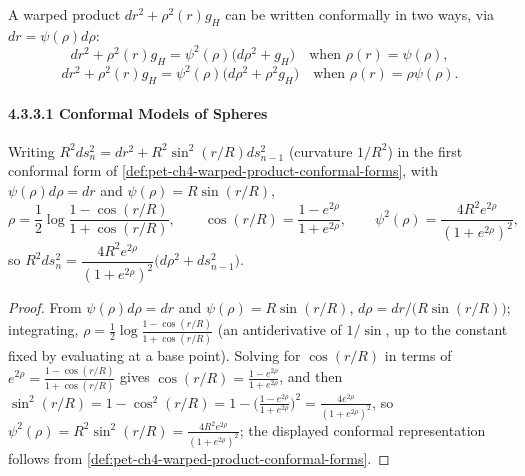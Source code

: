 \begin{definition}
  \label{def:pet-ch4-warped-product-conformal-forms}
  A warped product $dr^2+\rho^2(r)g_H$ can be written conformally in two ways,
  via $dr=\psi(\rho)d\rho$:
  \[
    dr^2+\rho^2(r)g_H=\psi^2(\rho)\big(d\rho^2+g_H\big)\quad\text{when }\rho(r)=\psi(\rho),
  \]
  \[
    dr^2+\rho^2(r)g_H=\psi^2(\rho)\big(d\rho^2+\rho^2g_H\big)\quad\text{when }\rho(r)=\rho\psi(\rho).
  \]
\end{definition}

\paragraph{4.3.3.1 Conformal Models of Spheres}

\begin{proposition}
  \label{prop:pet-ch4-mercator-model}
  Writing $R^2ds_n^2=dr^2+R^2\sin^2(r/R)ds_{n-1}^2$ (curvature $1/R^2$) in the
  first conformal form of \cref{def:pet-ch4-warped-product-conformal-forms},
  with $\psi(\rho)d\rho=dr$ and $\psi(\rho)=R\sin(r/R)$,
  \[
    \rho=\frac12\log\frac{1-\cos(r/R)}{1+\cos(r/R)},\qquad
    \cos(r/R)=\frac{1-e^{2\rho}}{1+e^{2\rho}},\qquad
    \psi^2(\rho)=\frac{4R^2e^{2\rho}}{(1+e^{2\rho})^2},
  \]
  so $R^2ds_n^2=\dfrac{4R^2e^{2\rho}}{(1+e^{2\rho})^2}\big(d\rho^2+ds_{n-1}^2\big)$.
\end{proposition}
\begin{proof}
  From $\psi(\rho)d\rho=dr$ and $\psi(\rho)=R\sin(r/R)$,
  $d\rho=dr/\big(R\sin(r/R)\big)$; integrating,
  $\rho=\tfrac12\log\tfrac{1-\cos(r/R)}{1+\cos(r/R)}$ (an antiderivative of
  $1/\sin$, up to the constant fixed by evaluating at a base point). Solving
  for $\cos(r/R)$ in terms of $e^{2\rho}=\tfrac{1-\cos(r/R)}{1+\cos(r/R)}$ gives
  $\cos(r/R)=\tfrac{1-e^{2\rho}}{1+e^{2\rho}}$, and then
  $\sin^2(r/R)=1-\cos^2(r/R)=1-\Big(\tfrac{1-e^{2\rho}}{1+e^{2\rho}}\Big)^2
  =\tfrac{4e^{2\rho}}{(1+e^{2\rho})^2}$, so
  $\psi^2(\rho)=R^2\sin^2(r/R)=\tfrac{4R^2e^{2\rho}}{(1+e^{2\rho})^2}$; the
  displayed conformal representation follows from
  \cref{def:pet-ch4-warped-product-conformal-forms}.
\end{proof}

